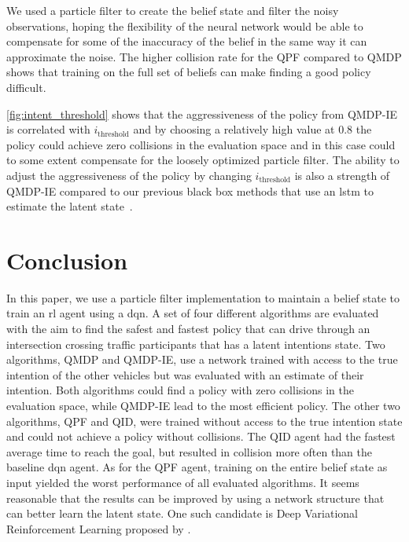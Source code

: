 We used a particle filter to create the belief state and filter the noisy observations, hoping the flexibility of the neural network would be able to compensate for some of the inaccuracy of the belief in the same way it can approximate the noise. The higher collision rate for the QPF compared to QMDP shows that training on the full set of beliefs can make finding a good policy difficult. 


\ref{fig:intent_threshold} shows that the aggressiveness of the policy from QMDP-IE is correlated with $i_\text{threshold}$ and by choosing a relatively high value at $0.8$ the policy could achieve zero collisions in the evaluation space and in this case could to some extent compensate for the loosely optimized particle filter. The ability to adjust the aggressiveness of the policy by changing $i_\text{threshold}$ is also a strength of QMDP-IE compared to our previous black box methods that use an \gls{lstm} to estimate the latent state~\cite{Tram2018}. %

\section{Conclusion}
\label{sec:conclusion}
In this paper, we use a particle filter implementation to maintain a belief state to train an \gls{rl} agent using a \gls{dqn}. 
A set of four different algorithms are evaluated with the aim to find the safest and fastest policy that can drive through an intersection crossing traffic participants that has a latent intentions state. 
Two algorithms, QMDP and QMDP-IE, use a network trained with access to the true intention of the other vehicles but was evaluated with an estimate of their intention. Both algorithms could find a policy with zero collisions in the evaluation space, while QMDP-IE lead to the most efficient policy.
The other two algorithms, QPF and QID, were trained without access to the true intention state and could not achieve a policy without collisions. 
The QID agent had the fastest average time to reach the goal, but resulted in collision more often than the baseline \gls{dqn} agent. As for the QPF agent, training on the entire belief state as input yielded the worst performance of all evaluated algorithms. It seems reasonable that the results can be improved by using a network structure that can better learn the latent state. One such candidate is Deep Variational Reinforcement Learning proposed by \citet{Igl2018}. 